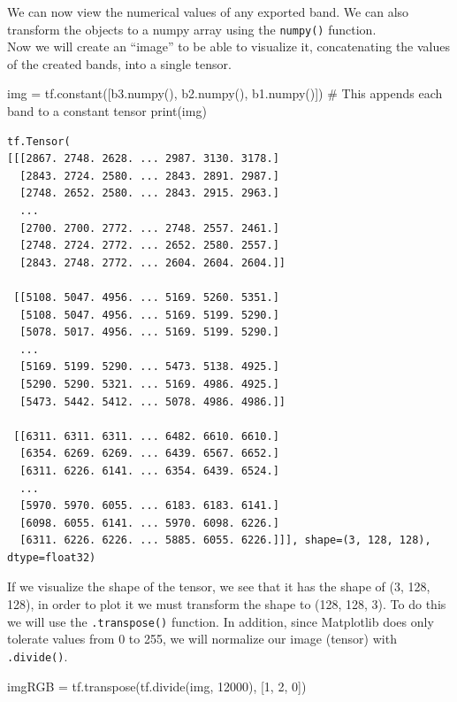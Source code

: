 \documentclass[
  letterpaper,
  DIV=11,
  numbers=noendperiod]{scrreprt}
\newenvironment{Shaded}{\begin{snugshade}}{\end{snugshade}}
\newcommand{\BuiltInTok}[1]{\textcolor[rgb]{0.00,0.23,0.31}{#1}}
\newcommand{\CommentTok}[1]{\textcolor[rgb]{0.37,0.37,0.37}{#1}}
\newcommand{\DecValTok}[1]{\textcolor[rgb]{0.68,0.00,0.00}{#1}}
\newcommand{\NormalTok}[1]{\textcolor[rgb]{0.00,0.23,0.31}{#1}}
\newcommand{\OperatorTok}[1]{\textcolor[rgb]{0.37,0.37,0.37}{#1}}
\begin{document}
We can now view the numerical values \hspace{0pt}\hspace{0pt}of any
exported band. We can also transform the objects to a numpy array using
the \texttt{numpy()} function.\\
Now we will create an ``image'' to be able to visualize it,
concatenating the values \hspace{0pt}\hspace{0pt}of the created bands,
into a single tensor.

\begin{Shaded}
\begin{Highlighting}[]
\NormalTok{img }\OperatorTok{=}\NormalTok{ tf.constant([b3.numpy(), b2.numpy(), b1.numpy()]) }\CommentTok{\# This appends each band to a constant tensor}
\BuiltInTok{print}\NormalTok{(img)}
\end{Highlighting}
\end{Shaded}

\begin{verbatim}
tf.Tensor(
[[[2867. 2748. 2628. ... 2987. 3130. 3178.]
  [2843. 2724. 2580. ... 2843. 2891. 2987.]
  [2748. 2652. 2580. ... 2843. 2915. 2963.]
  ...
  [2700. 2700. 2772. ... 2748. 2557. 2461.]
  [2748. 2724. 2772. ... 2652. 2580. 2557.]
  [2843. 2748. 2772. ... 2604. 2604. 2604.]]

 [[5108. 5047. 4956. ... 5169. 5260. 5351.]
  [5108. 5047. 4956. ... 5169. 5199. 5290.]
  [5078. 5017. 4956. ... 5169. 5199. 5290.]
  ...
  [5169. 5199. 5290. ... 5473. 5138. 4925.]
  [5290. 5290. 5321. ... 5169. 4986. 4925.]
  [5473. 5442. 5412. ... 5078. 4986. 4986.]]

 [[6311. 6311. 6311. ... 6482. 6610. 6610.]
  [6354. 6269. 6269. ... 6439. 6567. 6652.]
  [6311. 6226. 6141. ... 6354. 6439. 6524.]
  ...
  [5970. 5970. 6055. ... 6183. 6183. 6141.]
  [6098. 6055. 6141. ... 5970. 6098. 6226.]
  [6311. 6226. 6226. ... 5885. 6055. 6226.]]], shape=(3, 128, 128), dtype=float32)
\end{verbatim}

If we visualize the shape of the tensor, we see that it has the shape of
(3, 128, 128), in order to plot it we must transform the shape to (128,
128, 3). To do this we will use the \texttt{.transpose()} function. In
addition, since Matplotlib does only tolerate values from 0 to 255, we
will normalize our image (tensor) with \texttt{.divide()}.

\begin{Shaded}
\begin{Highlighting}[]
\NormalTok{imgRGB }\OperatorTok{=}\NormalTok{ tf.transpose(tf.divide(img, }\DecValTok{12000}\NormalTok{), [}\DecValTok{1}\NormalTok{, }\DecValTok{2}\NormalTok{, }\DecValTok{0}\NormalTok{])}
\end{Highlighting}
\end{Shaded}
\end{document}
